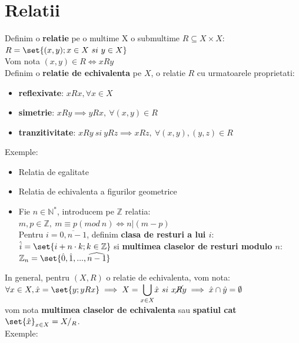 \documentclass{article}
\begin{document}
    \section{Relatii}
        Definim o \textbf{relatie} pe o multime X o submultime $R \subseteq X \times X$:\\
        $R = \set{(x,y); x\in X\ si\ y \in X}$\\
        Vom nota $(x,y) \in R \iff xRy$\\
        Definim o \textbf{relatie de echivalenta} pe $X$, o relatie $R$ cu urmatoarele proprietati:
        \begin{itemize}
            \item \textbf{reflexivate}: $xRx, \forall x \in X$
            \item \textbf{simetrie}: $xRy \implies yRx,\ \forall (x,y) \in R$
            \item \textbf{tranzitivitate}: $xRy\ si\ yRz \implies xRz,\ \forall (x,y),(y,z) \in R$
        \end{itemize}
        Exemple:
        \begin{itemize}
            \item Relatia de egalitate
            \item Relatia de echivalenta a figurilor geometrice
            \item Fie $n \in \mathbb{N}^*$, introducem pe $\mathbb{Z}$ relatia:\\ $m,p \in \mathbb{Z},\ m\equiv p (mod\ n) \iff n | (m-p)$\\
            Pentru $i = \overline{0,n-1}$, definim \textbf{clasa de resturi a lui $i$}: $\hat{i} = \set{i+n\cdot k; k \in \mathbb{Z}}$ si \textbf{multimea
                claselor de resturi modulo $n$}: $\mathbb{Z}_n = \set{\hat{0},\hat{1},...,\widehat{n-1}}$
        \end{itemize}
        In general, pentru $(X,R)$ o relatie de echivalenta, vom nota:\\ $\forall x \in X, \hat{x} = \set{y;yRx}\implies X = \displaystyle{\bigcup_{x\in X}}\hat{x}\ si\ x \cancel{R}y \implies \hat{x} \cap \hat{y} = \emptyset$\\
        vom nota \textbf{multimea claselor de echivalenta} sau \textbf{spatiul cat} $\set{\hat{x}}_{x\in X} = X/_R$.\\ 
        Exemple:
\end{document}
